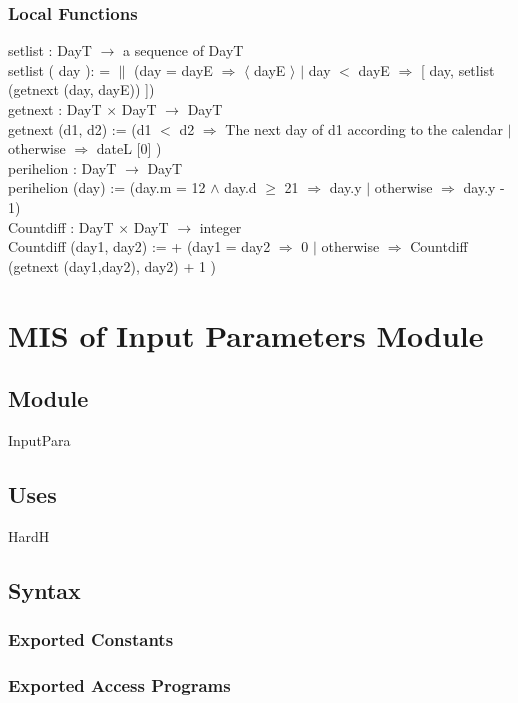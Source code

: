 \documentclass[12pt, titlepage]{article}
\begin{document}
\subsubsection{Local Functions}
setlist : DayT $\rightarrow $ a sequence of DayT\\
setlist ( day ): = $\|$ (day = dayE $\Rightarrow$ $\langle$ dayE $\rangle$ $|$ day $<$ dayE $\Rightarrow$ [ day, setlist (getnext (day,  dayE)) ]) \\

getnext : DayT $\times$ DayT $\rightarrow $ DayT\\
getnext (d1, d2) := (d1 $<$ d2 $\Rightarrow$ The next day of d1 according to the calendar $|$ otherwise $\Rightarrow$ dateL [0] )\\

perihelion : DayT $\rightarrow $ DayT\\
perihelion (day) :=  (day.m = 12 $	\wedge$ day.d $\geq	$ 21 $\Rightarrow$  day.y $|$ otherwise $\Rightarrow$  day.y - 1)\\

Countdiff : DayT $\times$ DayT $\rightarrow $ integer\\
Countdiff (day1, day2) := + (day1 = day2 $\Rightarrow$ 0 $|$ otherwise $\Rightarrow$ Countdiff (getnext (day1,day2), day2) + 1 )


\section{MIS of Input Parameters Module} \label{ModuleIP} 

\subsection{Module}
InputPara

\subsection{Uses}
HardH

\subsection{Syntax}

\subsubsection{Exported Constants}


\subsubsection{Exported Access Programs}
\end{document}

